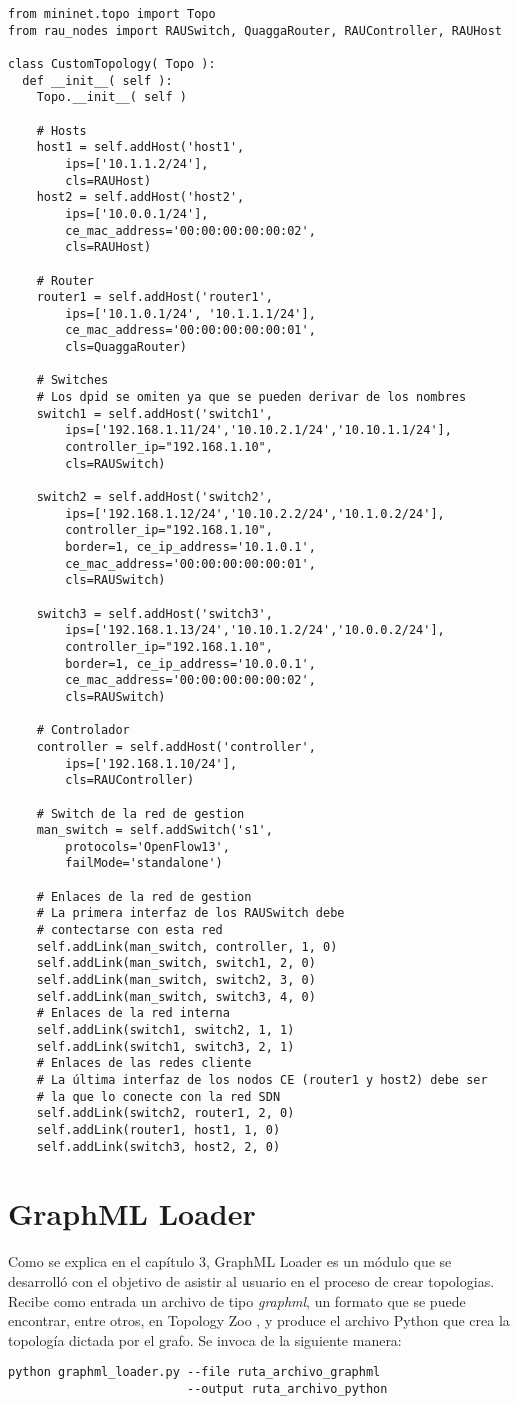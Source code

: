 \begin{verbatim}
from mininet.topo import Topo
from rau_nodes import RAUSwitch, QuaggaRouter, RAUController, RAUHost

class CustomTopology( Topo ):
  def __init__( self ):
	Topo.__init__( self )

	# Hosts
	host1 = self.addHost('host1',
		ips=['10.1.1.2/24'],
		cls=RAUHost)
	host2 = self.addHost('host2',
		ips=['10.0.0.1/24'],
		ce_mac_address='00:00:00:00:00:02',
		cls=RAUHost)
	
	# Router	
	router1 = self.addHost('router1',
		ips=['10.1.0.1/24', '10.1.1.1/24'],
		ce_mac_address='00:00:00:00:00:01',
		cls=QuaggaRouter)
		
	# Switches
	# Los dpid se omiten ya que se pueden derivar de los nombres
	switch1 = self.addHost('switch1',
		ips=['192.168.1.11/24','10.10.2.1/24','10.10.1.1/24'],
		controller_ip="192.168.1.10",
		cls=RAUSwitch)

	switch2 = self.addHost('switch2',
		ips=['192.168.1.12/24','10.10.2.2/24','10.1.0.2/24'],
		controller_ip="192.168.1.10",
		border=1, ce_ip_address='10.1.0.1',
		ce_mac_address='00:00:00:00:00:01',
		cls=RAUSwitch)
		
	switch3 = self.addHost('switch3',
		ips=['192.168.1.13/24','10.10.1.2/24','10.0.0.2/24'],
		controller_ip="192.168.1.10",
		border=1, ce_ip_address='10.0.0.1',
		ce_mac_address='00:00:00:00:00:02',
		cls=RAUSwitch)
		
	# Controlador
	controller = self.addHost('controller',
		ips=['192.168.1.10/24'],
		cls=RAUController)
		
	# Switch de la red de gestion
	man_switch = self.addSwitch('s1',
		protocols='OpenFlow13',
		failMode='standalone')
		
	# Enlaces de la red de gestion
	# La primera interfaz de los RAUSwitch debe
	# contectarse con esta red
	self.addLink(man_switch, controller, 1, 0)
	self.addLink(man_switch, switch1, 2, 0)
	self.addLink(man_switch, switch2, 3, 0)
	self.addLink(man_switch, switch3, 4, 0)
	# Enlaces de la red interna
	self.addLink(switch1, switch2, 1, 1)
	self.addLink(switch1, switch3, 2, 1)
	# Enlaces de las redes cliente
	# La última interfaz de los nodos CE (router1 y host2) debe ser
	# la que lo conecte con la red SDN
	self.addLink(switch2, router1, 2, 0)
	self.addLink(router1, host1, 1, 0)	
	self.addLink(switch3, host2, 2, 0)
\end{verbatim}


\section{GraphML Loader}
Como se explica en el capítulo 3, GraphML Loader es un módulo que se desarrolló con el objetivo de asistir al usuario en el proceso de crear topologias. Recibe como entrada un archivo de tipo \textit{graphml}, un formato que se puede encontrar, entre otros, en Topology Zoo \cite{topology-zoo}, y produce el archivo Python que crea la topología dictada por el grafo. Se invoca de la siguiente manera:
\begin{lstlisting}
python graphml_loader.py --file ruta_archivo_graphml
                         --output ruta_archivo_python
\end{lstlisting}


